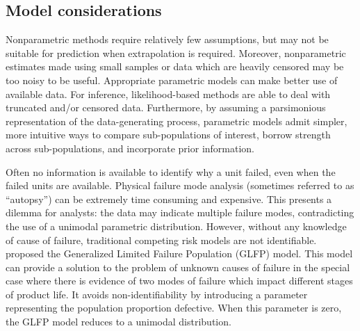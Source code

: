 \documentclass[11pt]{article}
\begin{document}
\subsection{Model considerations}
Nonparametric methods require relatively few assumptions, but may not be suitable for prediction when extrapolation is required. Moreover, nonparametric estimates made using small samples or data which are heavily censored may be too noisy to be useful. Appropriate parametric models can make better use of available data. For inference, likelihood-based methods are able to deal with truncated and/or censored data. Furthermore, by assuming a parsimonious representation of the data-generating process, parametric models admit simpler, more intuitive ways to compare sub-populations of interest, borrow strength across sub-populations, and incorporate prior information. 

Often no information is available to identify why a unit failed, even when the failed units are available. Physical failure mode analysis (sometimes referred to as ``autopsy'') can be extremely time consuming and expensive. This presents a dilemma for analysts: the data may indicate multiple failure modes, contradicting the use of a unimodal parametric distribution. However, without any knowledge of cause of failure, traditional competing risk models are not identifiable. \citet{chan} proposed the Generalized Limited Failure Population (GLFP) model. This model can provide a solution to the problem of unknown causes of failure in the special case where there is evidence of two modes of failure which impact different stages of product life. It avoids non-identifiability by introducing a parameter representing the population proportion defective. When this parameter is zero, the GLFP model reduces to a unimodal distribution. \\
\end{document}
